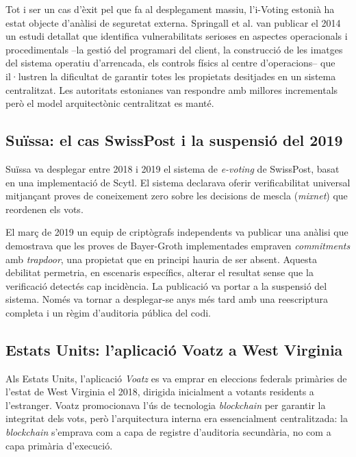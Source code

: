 Tot i ser un cas d'èxit pel que fa al desplegament massiu, l'i-Voting
estonià ha estat objecte d'anàlisi de seguretat externa. Springall et
al. \cite{springall2014estonia} van publicar el 2014 un estudi
detallat que identifica vulnerabilitats serioses en aspectes
operacionals i procedimentals --la gestió del programari del client, la
construcció de les imatges del sistema operatiu d'arrencada, els
controls físics al centre d'operacions-- que il·lustren la dificultat
de garantir totes les propietats desitjades en un sistema
centralitzat. Les autoritats estonianes van respondre amb millores
incrementals però el model arquitectònic centralitzat es manté.

\subsection{Suïssa: el cas SwissPost i la suspensió del 2019}

Suïssa va desplegar entre 2018 i 2019 el sistema de \emph{e-voting} de
SwissPost, basat en una implementació de Scytl. El sistema declarava
oferir verificabilitat universal mitjançant proves de coneixement zero
sobre les decisions de mescla (\emph{mixnet}) que reordenen els vots.

El març de 2019 un equip de criptògrafs independents
\cite{lewis2019swisspost} va publicar una anàlisi que demostrava que
les proves de Bayer-Groth implementades empraven \emph{commitments}
amb \emph{trapdoor}, una propietat que en principi hauria de ser
absent. Aquesta debilitat permetria, en escenaris específics, alterar
el resultat sense que la verificació detectés cap incidència. La
publicació va portar a la suspensió del sistema. Només va tornar a
desplegar-se anys més tard amb una reescriptura completa i un règim
d'auditoria pública del codi.

\subsection{Estats Units: l'aplicació Voatz a West Virginia}

Als Estats Units, l'aplicació \emph{Voatz} es va emprar en eleccions
federals primàries de l'estat de West Virginia el 2018, dirigida
inicialment a votants residents a l'estranger. Voatz promocionava
l'ús de tecnologia \emph{blockchain} per garantir la integritat dels
vots, però l'arquitectura interna era essencialment centralitzada: la
\emph{blockchain} s'emprava com a capa de registre d'auditoria
secundària, no com a capa primària d'execució.

